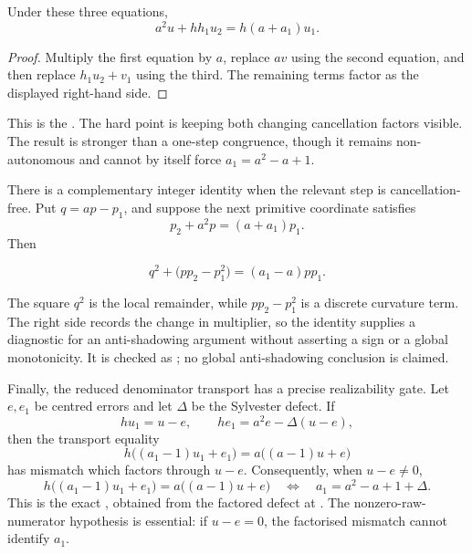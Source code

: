 \begin{theorem}\label{res:secondorder}
Under these three equations,
\[
 a^2u+hh_1u_2=h(a+a_1)u_1.
\]
\end{theorem}

\begin{proof}
Multiply the first equation by $a$, replace $av$ using the second equation,
and then replace $h_1u_2+v_1$ using the third.  The remaining terms factor as
the displayed right-hand side.
\end{proof}

\noindent This is the
.  The hard point is keeping both changing cancellation
factors visible.  The result is stronger than a one-step congruence, though it
remains non-autonomous and cannot by itself force $a_1=a^2-a+1$.

There is a complementary integer identity when the relevant step is
cancellation-free.  Put $q=ap-p_1$, and suppose the next primitive coordinate
satisfies
\[
 p_2+a^2p=(a+a_1)p_1.
\]
Then
\begin{theorem}\label{res:curvature}
\[
 q^2+\bigl(pp_2-p_1^2\bigr)=(a_1-a)pp_1.
\]
\end{theorem}

The square $q^2$ is the local remainder, while $pp_2-p_1^2$ is a discrete
curvature term.  The right side records the change in multiplier, so the
identity supplies a diagnostic for an anti-shadowing argument without
asserting a sign or a global monotonicity.  It is checked as
; no global anti-shadowing conclusion is
claimed.

Finally, the reduced denominator transport has a precise realizability gate.
Let $e,e_1$ be centred errors and let $\Delta$ be the Sylvester defect.  If
\[
 hu_1=u-e,
 \qquad he_1=a^2e-\Delta(u-e),
\]
then the transport equality
\[
 h\bigl((a_1-1)u_1+e_1\bigr)
   =a\bigl((a-1)u+e\bigr)
\]
has mismatch which factors through $u-e$.  Consequently, when $u-e\ne0$,
\[
 h\bigl((a_1-1)u_1+e_1\bigr)
   =a\bigl((a-1)u+e\bigr)
 \quad\Longleftrightarrow\quad
 a_1=a^2-a+1+\Delta.
\]
This is the exact
, obtained from the factored defect at
.  The nonzero-raw-numerator hypothesis is essential: if
$u-e=0$, the factorised mismatch cannot identify $a_1$.

